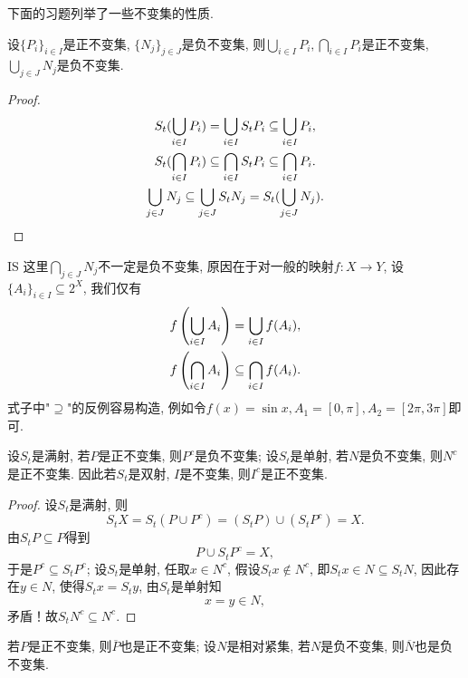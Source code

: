 下面的习题列举了一些不变集的性质. 

\begin{exercise}
	设$\{P_{i}\}_{i\in I}$是正不变集, $\{N_{j}\}_{j\in J}$是负不变集, 则$\bigcup\limits_{i\in I}P_{i},\bigcap\limits_{i\in I}P_{i}$是正不变集, $\bigcup\limits_{j\in J}N_{j}$是负不变集. 
\end{exercise}

\begin{proof}
	\begin{gather}
		S_{t}(\bigcup_{i\in I}P_{i})=\bigcup_{i\in I}S_{t}P_{i}\subseteq \bigcup_{i\in I}P_{i},\notag
		\\S_{t}(\bigcap_{i\in I}P_{i})\subseteq\bigcap_{i\in I}S_{t}P_{i}\subseteq \bigcap_{i\in I}P_{i}.\notag
		\\\bigcup_{j\in J}N_{j}\subseteq \bigcup_{j\in J}S_{t}N_{j}= S_{t}(\bigcup_{j\in J}N_{j}).\notag
	\end{gather}
\end{proof}

\begin{remark}{}{IS}
	这里$\bigcap\limits_{j\in J}N_{j}$不一定是负不变集, 原因在于对一般的映射$f:X\to Y$, 设$\{A_{i}\}_{i\in I}\subseteq 2^{X}$, 我们仅有
	\begin{gather}
		f\left(\bigcup_{i\in I}A_{i}\right)=\bigcup_{i\in I}f(A_{i}),\notag\\f\left(\bigcap_{i\in I}A_{i}\right)\subseteq\bigcap_{i\in I}f(A_{i}).\label{equ:IS}
	\end{gather}
	式子中"$\supseteq$"的反例容易构造, 例如令$f(x)=\sin x, A_{1}=[0,\pi], A_{2}=[2\pi, 3\pi]$即可. 
\end{remark}

\begin{exercise}
	设$S_{t}$是满射, 若$P$是正不变集, 则$P^{c}$是负不变集; 设$S_{t}$是单射, 若$N$是负不变集, 则$N^{c}$是正不变集. 因此若$S_{t}$是双射, $I$是不变集, 则$I^{c}$是正不变集.
\end{exercise}

\begin{proof}
	设$S_{t}$是满射, 则$$
	S_{t}X=S_{t}(P\cup P^{c})=(S_{t}P)\cup (S_{t}P^{c})=X.$$由$S_{t}P\subseteq P$得到$$
	P\cup S_{t}P^{c}=X,$$于是$P^{c}\subseteq S_{t}P^{c}$; 设$S_{t}$是单射, 任取$x\in N^{c}$, 假设$S_{t}x\notin N^{c}$, 即$S_{t}x\in N\subseteq S_{t}N$, 因此存在$y\in N$, 使得$S_{t}x=S_{t}y$, 由$S_{t}$是单射知$$x=y\in N,$$矛盾！故$S_{t}N^{c}\subseteq N^{c}$.
\end{proof}

\begin{exercise}
	若$P$是正不变集, 则$\overline{P}$也是正不变集; 设$N$是相对紧集, 若$N$是负不变集, 则$\overline{N}$也是负不变集. 
\end{exercise}

